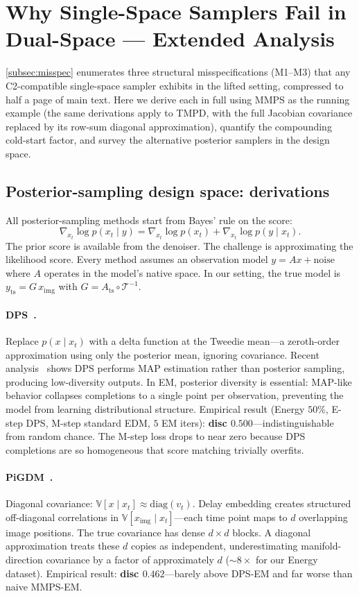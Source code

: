 \documentclass{article}
\theoremstyle{plain}
\theoremstyle{definition}
\theoremstyle{remark}
\newcommand{\imgts}{\mathcal{T}^{-1}}
\newcommand{\Ats}{A_{\mathrm{ts}}}
\newcommand{\yts}{y_{\mathrm{ts}}}
\newcommand{\ximg}{x_{\mathrm{img}}}
\begin{document}
\section{Why Single-Space Samplers Fail in Dual-Space --- Extended Analysis}
\label{app:mmps-fails}

\cref{subsec:misspec} enumerates three structural misspecifications (M1--M3) that any C2-compatible single-space sampler exhibits in the lifted setting, compressed to half a page of main text. Here we derive each in full using MMPS as the running example (the same derivations apply to TMPD, with the full Jacobian covariance replaced by its row-sum diagonal approximation), quantify the compounding cold-start factor, and survey the alternative posterior samplers in the design space.

\subsection{Posterior-sampling design space: derivations}
\label{app:sampler-design-space}

All posterior-sampling methods start from Bayes' rule on the score:
$$
\nabla_{x_t} \log p(x_t \mid y) = \nabla_{x_t} \log p(x_t) + \nabla_{x_t} \log p(y \mid x_t).
$$
The prior score is available from the denoiser. The challenge is approximating the likelihood score. Every method assumes an observation model $y = Ax + \mathrm{noise}$ where $A$ operates in the model's native space. In our setting, the true model is $\yts = G\,\ximg$ with $G = \Ats \circ \imgts$.

\paragraph{DPS~\citep{chung2023dps}.}
Replace $p(x \mid x_t)$ with a delta function at the Tweedie mean---a zeroth-order approximation using only the posterior mean, ignoring covariance. Recent analysis~\citep{luo2025rethinking} shows DPS performs MAP estimation rather than posterior sampling, producing low-diversity outputs. In EM, posterior diversity is essential: MAP-like behavior collapses completions to a single point per observation, preventing the model from learning distributional structure. Empirical result (Energy $50\%$, E-step DPS, M-step standard EDM, $5$ EM iters): \textbf{disc $0.500$}---indistinguishable from random chance. The M-step loss drops to near zero because DPS completions are so homogeneous that score matching trivially overfits.

\paragraph{PiGDM~\citep{song2023pigdm}.}
Diagonal covariance: $\mathbb{V}[x \mid x_t] \approx \mathrm{diag}(v_t)$. Delay embedding creates structured off-diagonal correlations in $\mathbb{V}[\ximg \mid x_t]$---each time point maps to $d$ overlapping image positions. The true covariance has dense $d \times d$ blocks. A diagonal approximation treats these $d$ copies as independent, underestimating manifold-direction covariance by a factor of approximately $d$ (${\sim}8\times$ for our Energy dataset). Empirical result: \textbf{disc $0.462$}---barely above DPS-EM and far worse than naive MMPS-EM.
\end{document}
